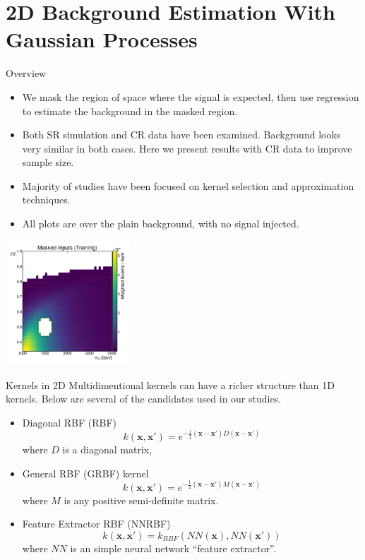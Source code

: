 \documentclass[10pt]{beamer}
\begin{document}
\section[Regression Results]{2D Background Estimation With Gaussian Processes}
\label{sec:2d-gauss-proc}

\begin{frame}{Overview}
  \begin{itemize}
  \item We mask the region of space where the signal is expected, then use regression to estimate the background in the masked region.
  \item Both SR simulation and CR data have been examined. Background looks very similar in both cases. Here we present results with CR data to improve sample size. 
  \item Majority of studies have been focused on kernel selection and approximation techniques.
  \item All plots are over the plain background, with no signal injected.
  \end{itemize}
  \begin{center}
    \includegraphics[width=0.35\textwidth]{figures/training_points}
  \end{center}
\end{frame}

\begin{frame}{Kernels in 2D}
  Multidimentional kernels can have a richer structure than 1D kernels. Below are several of the candidates used in our studies.
  \begin{itemize}
  \item Diagonal RBF (RBF)
    \begin{equation}
      k(\bm{x},\bm{x'}) = e^{ -\frac{1}{2} \left(  \bm{x} - \bm{x'}\right) D \left(  \bm{x} - \bm{x'}\right)}
    \end{equation}
    where $D$ is a diagonal matrix,
  \item General RBF (GRBF) kernel
    \begin{equation}
      k(\bm{x},\bm{x'}) = e^{ -\frac{1}{2} \left(  \bm{x} - \bm{x'}\right) M \left(  \bm{x} - \bm{x'}\right)}
    \end{equation}
    where $M$ is any positive semi-definite matrix.
  \item Feature Extractor RBF (NNRBF)
    \begin{equation}
      k(\bm{x},\bm{x'}) =  k_{RBF}(NN(\bm{x}),NN(\bm{x'}))
    \end{equation}
    where $NN$ is an simple neural network ``feature extractor''.
  \end{itemize}
\end{frame}
\end{document}
